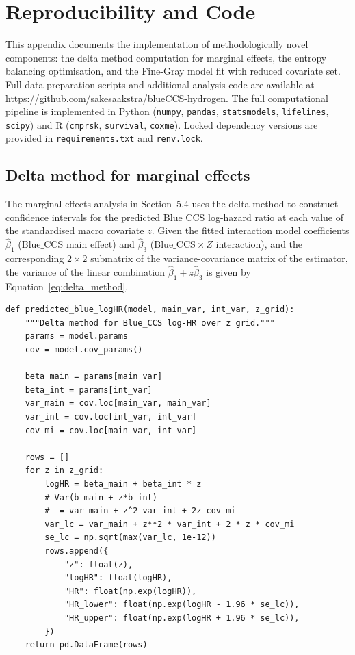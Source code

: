 \documentclass[review,authoryear,11pt]{elsarticle}
\newcommand{\BlueCCS}{\mathrm{Blue\_CCS}}
\begin{document}
\appendix

\section{Reproducibility and Code}

This appendix documents the implementation of methodologically novel components: the delta method computation for marginal effects, the entropy balancing optimisation, and the Fine-Gray model fit with reduced covariate set. Full data preparation scripts and additional analysis code are available at \url{https://github.com/sakesaakstra/blueCCS-hydrogen}. The full computational pipeline is implemented in Python (\texttt{numpy}, \texttt{pandas}, \texttt{statsmodels}, \texttt{lifelines}, \texttt{scipy}) and R (\texttt{cmprsk}, \texttt{survival}, \texttt{coxme}). Locked dependency versions are provided in \texttt{requirements.txt} and \texttt{renv.lock}.

\subsection{Delta method for marginal effects}

The marginal effects analysis in Section~5.4 uses the delta method to construct confidence intervals for the predicted $\BlueCCS$ log-hazard ratio at each value of the standardised macro covariate $z$. Given the fitted interaction model coefficients $\hat\beta_1$ ($\BlueCCS$ main effect) and $\hat\beta_3$ ($\BlueCCS \times Z$ interaction), and the corresponding $2 \times 2$ submatrix of the variance-covariance matrix of the estimator, the variance of the linear combination $\hat\beta_1 + z\hat\beta_3$ is given by Equation~\ref{eq:delta_method}.

\begin{lstlisting}[style=python, caption={Delta method implementation for marginal effects.}, label={lst:delta}]
def predicted_blue_logHR(model, main_var, int_var, z_grid):
    """Delta method for Blue_CCS log-HR over z grid."""
    params = model.params
    cov = model.cov_params()

    beta_main = params[main_var]
    beta_int = params[int_var]
    var_main = cov.loc[main_var, main_var]
    var_int = cov.loc[int_var, int_var]
    cov_mi = cov.loc[main_var, int_var]

    rows = []
    for z in z_grid:
        logHR = beta_main + beta_int * z
        # Var(b_main + z*b_int)
        #  = var_main + z^2 var_int + 2z cov_mi
        var_lc = var_main + z**2 * var_int + 2 * z * cov_mi
        se_lc = np.sqrt(max(var_lc, 1e-12))
        rows.append({
            "z": float(z),
            "logHR": float(logHR),
            "HR": float(np.exp(logHR)),
            "HR_lower": float(np.exp(logHR - 1.96 * se_lc)),
            "HR_upper": float(np.exp(logHR + 1.96 * se_lc)),
        })
    return pd.DataFrame(rows)
\end{lstlisting}
\end{document}
